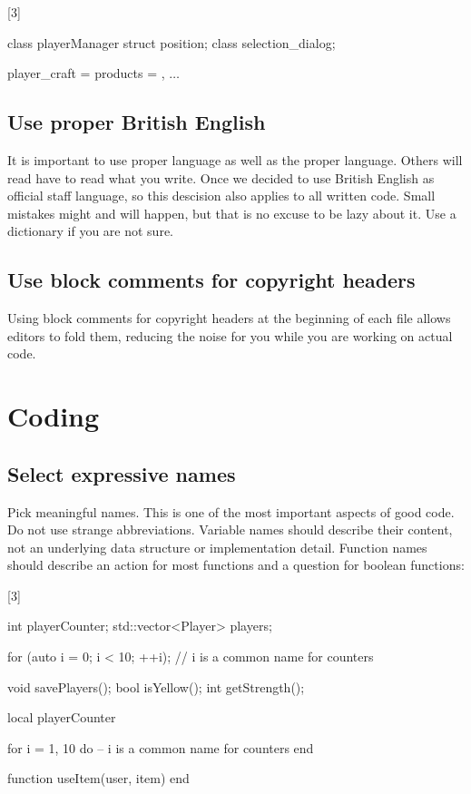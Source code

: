 \documentclass[a4paper,11pt]{scrreprt}
\newcommand{\marginMarker}[1]{%
\marginnote{%
    \hfill%
		\Huge{#1}%
}[3\baselineskip]%
}
\newcommand{\conforming}{%
\marginMarker{\textcolor{green}{\ding{51}}}%
}
\newcommand{\nonconforming}{%
\marginMarker{\textcolor{red}{\ding{55}}}%
}
\begin{document}
\nonconforming{}
\begin{cppBox}
class playerManager
struct position;
class selection_dialog;
\end{cppBox}
\begin{luaBox}[mathescape]
player_craft = {
    products = {},
    $\dots$
}
\end{luaBox}

\section{Use proper British English}
It is important to use proper language as well as the proper language. Others will read have to read what you write. Once we decided to use British English as official staff language, so this descision also applies to all written code. Small mistakes might and will happen, but that is no excuse to be lazy about it. Use a dictionary if you are not sure.

\section{Use block comments for copyright headers}
Using block comments for copyright headers at the beginning of each file allows editors to fold them, reducing the noise for you while you are working on actual code.


\chapter{Coding}
\section{Select expressive names}
Pick meaningful names. This is one of the most important aspects of good code. Do not use strange abbreviations. Variable names should describe their content, not an underlying data structure or implementation detail. Function names should describe an action for most functions and a question for boolean functions:

\conforming{}
\begin{cppBox}
int playerCounter;
std::vector<Player> players;

for (auto i = 0; i < 10; ++i); // i is a common name for counters

void savePlayers();
bool isYellow();
int getStrength();
\end{cppBox}
\begin{luaBox}
local playerCounter

for i = 1, 10 do -- i is a common name for counters
end

function useItem(user, item)
end
\end{luaBox}
\end{document}
